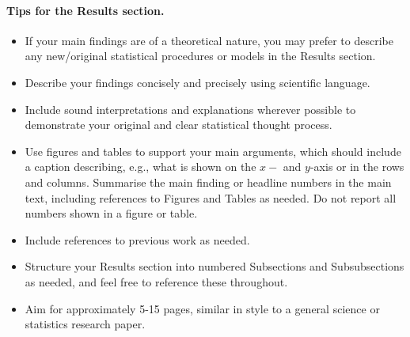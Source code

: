 \paragraph{Tips for the Results section.} 

\begin{itemize}
    \item If your main findings are of a theoretical nature, you may prefer to describe any new/original statistical procedures or models in the Results section.
    \item Describe your findings concisely and precisely using scientific language. 
    \item Include sound interpretations and explanations wherever possible to demonstrate your original and clear statistical thought process. 
    \item Use figures and tables to support your main arguments, which should include a caption describing, e.g., what is shown on the $x-$ and $y$-axis or in the rows and columns. Summarise the main finding or headline numbers in the main text, including references to Figures and Tables as needed. Do not report all numbers shown in a figure or table.
    \item Include references to previous work as needed. 
    \item Structure your Results section into numbered Subsections and Subsubsections as needed, and feel free to reference these throughout.
    \item Aim for approximately 5-15 pages, similar in style to a general science or statistics research paper.
\end{itemize}
